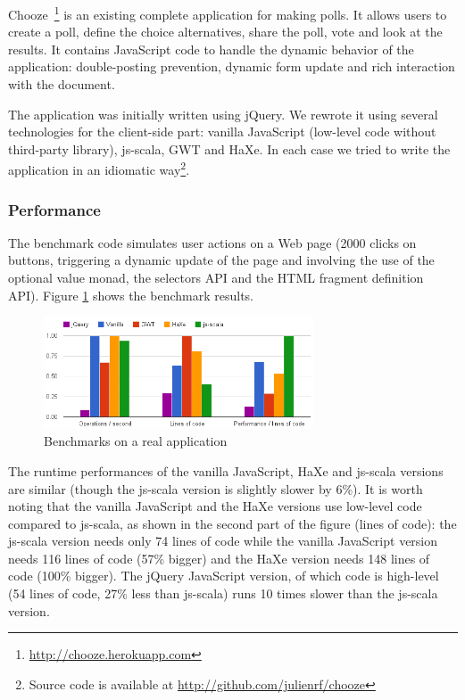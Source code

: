 \documentclass[preprint]{sigplanconf}
\begin{document}
Chooze~\footnote{\href{http://chooze.herokuapp.com}{http://chooze.herokuapp.com}} is an existing complete
application for making polls. It allows users to create a poll, define the choice alternatives, share the poll, vote
and look at the results. It contains JavaScript code to handle the dynamic behavior of the application:
double-posting prevention, dynamic form update and rich interaction with the document.

The application was initially written using jQuery. We rewrote it using several technologies for the client-side
part: vanilla JavaScript (low-level code without third-party library), js-scala, GWT and HaXe. In each case we
tried to write the application in an idiomatic way\footnote{Source code is available at
\href{http://github.com/julienrf/chooze}{http://github.com/julienrf/chooze}}.

\subsubsection{Performance}

The benchmark code simulates user actions on a Web page (2000 clicks on buttons, triggering a dynamic update of
the page and involving the use of the optional value monad, the selectors API and the HTML fragment definition API).
Figure \ref{benchmark} shows the benchmark results.

\begin{figure}
\centering
\includegraphics[width=8cm]{chooze.png}
\caption{Benchmarks on a real application}
\label{benchmark}
\end{figure}

The runtime performances of the vanilla JavaScript, HaXe and js-scala versions are similar (though the js-scala
version is slightly slower by 6\%). It is worth noting that the vanilla JavaScript and the HaXe versions use
low-level code compared to js-scala, as shown in the second part of the figure (lines of code): the js-scala version
needs only 74 lines of code while the vanilla JavaScript version needs 116 lines of code (57\% bigger) and the HaXe
version needs 148 lines of code (100\% bigger). The jQuery JavaScript version, of which code is high-level (54 lines
of code, 27\% less than js-scala) runs 10 times slower than the js-scala version.
\end{document}
